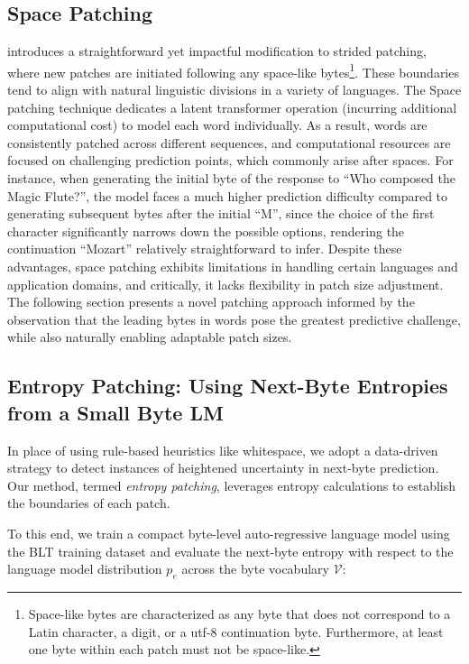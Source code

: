 \subsection{Space Patching}
\label{section:white-patch}

\citet{slagle2024spacebyte} introduces a straightforward yet impactful modification to strided patching, where new patches are initiated following any space-like bytes\footnote{
    Space-like bytes are characterized as any byte that does not correspond to a Latin character, a digit, or a utf-8 continuation byte. Furthermore, at least one byte within each patch must not be space-like.}. These boundaries tend to align with natural linguistic divisions in a variety of languages. The Space patching technique dedicates a latent transformer operation (incurring additional computational cost) to model each word individually. As a result, words are consistently patched across different sequences, and computational resources are focused on challenging prediction points, which commonly arise after spaces. For instance, when generating the initial byte of the response to ``Who composed the Magic Flute?\uline{\hspace{.6em}}'', the model faces a much higher prediction difficulty compared to generating subsequent bytes after the initial ``M'', since the choice of the first character significantly narrows down the possible options, rendering the continuation ``Mozart'' relatively straightforward to infer. Despite these advantages, space patching exhibits limitations in handling certain languages and application domains, and critically, it lacks flexibility in patch size adjustment. The following section presents a novel patching approach informed by the observation that the leading bytes in words pose the greatest predictive challenge, while also naturally enabling adaptable patch sizes.

\subsection{Entropy Patching: Using Next-Byte Entropies from a Small Byte LM}
\label{section:dyn-patch}

In place of using rule-based heuristics like whitespace, we adopt a data-driven strategy to detect instances of heightened uncertainty in next-byte prediction. Our method, termed \textit{entropy patching}, leverages entropy calculations to establish the boundaries of each patch.

To this end, we train a compact byte-level auto-regressive language model using the {\textsc BLT} training dataset and evaluate the next-byte entropy with respect to the language model distribution $p_{e}$ across the byte vocabulary $\mathcal{V}$:

